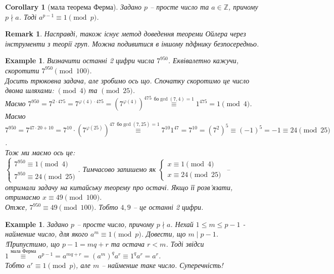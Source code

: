 \documentclass[a4paper, 14pt]{extarticle}
\theoremstyle{theoremdd}
\theoremstyle{theoremdd}
\theoremstyle{theoremdd}
\theoremstyle{theoremdd}
\newtheorem{example}[theorem]{Example}
\theoremstyle{theoremdd}
\theoremstyle{theoremdd}
\newtheorem{remark}[theorem]{Remark}
\theoremstyle{theoremdd}
\theoremstyle{theoremdd}
\newtheorem{corollary}[theorem]{Corollary}
\begin{document}
\begin{corollary}[мала теорема Ферма]
Задано $p$ -- просте число та $a \in \mathbb{Z}$, причому $p \nmid a$. Тоді $a^{p-1} \equiv 1 \pmod p$.
\end{corollary}

\begin{remark}
Насправді, також існує метод доведення теореми Ойлера через інструменти з теорії груп. Можна подивитися в іншому пдфнику безпосередньо.
\end{remark}

\begin{example}
Визначити останні 2 цифри числа $7^{950}$. Еквівалетно кажучи, скоротити $7^{950} \pmod {100}$.\\
Досить трюковна задача, але зробимо ось що. Спочатку скоротимо це число двома шляхами: $\!\!\pmod 4$ та $\!\!\pmod {25}$.\\
Маємо $7^{950} = 7^{2 \cdot 475} = 7^{\varphi(4) \cdot 475} = (7^{\varphi(4)})^{475} \overset{\text{бо} \gcd(7,4) = 1}{\equiv} 1^{475} = 1 \pmod 4$.\\
Маємо $7^{950} = 7^{47 \cdot 20 + 10} = 7^{10} \cdot (7^{\varphi(25)})^{47} \overset{\text{бо} \gcd(7,25) = 1}{\equiv} 7^{10} 1^{47} = 7^{10} = (7^2)^5 \equiv (-1)^5 = -1 \equiv 24 \pmod {25}$.\\
Тож ми маємо ось це:\\
$\begin{cases}
7^{950} \equiv 1 \pmod 4 \\
7^{950} \equiv 24 \pmod {25} 
\end{cases}$. Тимчасово запишемо як $\begin{cases}
x \equiv 1 \pmod 4 \\
x \equiv 24 \pmod {25} 
\end{cases}$ -- отримали задачу на китайську теорему про остачі. Якщо її розв'язати, отримаємо $x \equiv 49 \pmod {100}$.\\
Отже, $7^{950} \equiv 49 \pmod {100}$. Тобто $4,9$ -- це останні 2 цифри.
\end{example}

\begin{example}
Задано $p$ -- просте число, причому $p \nmid a$. Нехай $1 \leq  m \leq p-1$ - найменше число, для якого $a^m \equiv 1 \pmod p$. Довести, що $m \mid p-1$.\\
!Припустимо, що $p-1 = mq + r$ та остача $r < m$. Тоді звідси\\
$1 \overset{\text{мала Ферма}}{\equiv} a^{p-1} = a^{mq+r} = (a^m)^q a^r \equiv 1^q a^r = a^r$.\\
Тобто $a^{r} \equiv 1 \pmod p$, але $m$ -- найменше таке число. Суперечність!
\end{example}
\end{document}
